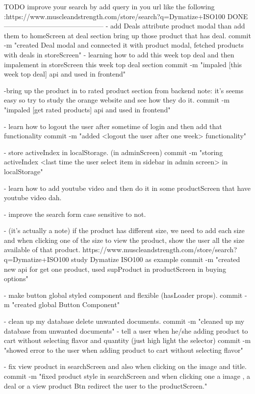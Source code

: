 
TODO improve your search by add query in you url like the following :https://www.muscleandstrength.com/store/search?q=Dymatize+ISO100
DONE
--------------------------------------------
- add Deals attribute product modal than add them to homeScreen 
       at deal section bring up those product that has deal.
       commit -m "created Deal modal and connected it with product modal, fetched products with deals in 
       storeScreen"
- learning how to add this week top deal and then impalement in storeScreen this week top deal section
      commit -m "impaled [this week top deal] api and used in frontend"

-bring up the product in to rated product section from backend 
      note: it's seems easy so try to study the orange website and see how they do it.
      commit -m "impaled [get rated products] api and used in frontend"

-   learn how to logout the user after sometime of login and 
            then add that functionality
      commit -m "added <logout the user after one week> functionality"

- store activeIndex in localStorage. (in adminScreen)
      commit -m "storing activeIndex <last time the user select item in sidebar in admin screen> in localStorage"

- learn how to add youtube video and then do it in some 
      productScreen that have youtube video dah.

- improve the search form case sensitive to not.

-  (it's actually a note) if the product has different size, 
      we need to add each size and when
      clicking one of the size to view the product, show the 
      user all the size available of that product.
      https://www.muscleandstrength.com/store/search?q=Dymatize+ISO100
      study Dymatize ISO100 as example
      commit -m "created new api for get one product, used supProduct in productScreen in buying options"

-   make button global styled component and flexible 
      (hasLoader props).
      commit -m "created global Button Component"

- clean up my database delete unwanted documents.
      commit -m "cleaned up my database from unwanted documents"
-  tell a user when he/she adding product to cart without 
selecting flavor and quantity (just high light the selector)
      commit -m "showed error to the user when adding product to cart without selecting flavor"

-   fix view product in searchScreen and also when clicking on the image and title.
      commit -m "fixed product style in searchScreen and when clicking one a image , a deal or a view product Btn redirect the user to the productScreen."

